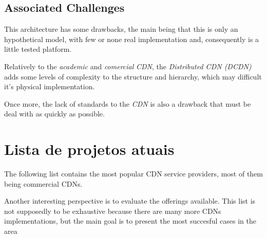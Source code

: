 \documentclass{llncs}
\begin{document}
\subsection{Associated Challenges}

This architecture has some drawbacks, the main being that this is
only an hypothetical model, with few or none real implementation
and, consequently is a little tested platform.

Relatively to the \emph{academic} and \emph{comercial} \textit{CDN},
the \emph{Distributed CDN (DCDN)} adds some levels of complexity to the structure and
hierarchy, which may difficult it's physical implementation.

Once more, the lack of standards to the \textit{CDN} is also
a drawback that must be deal with as quickly as possible.




\section{Lista de projetos atuais}							%

The following list contains the most popular CDN service providers,
most of them being commercial CDNs. 

Another interesting perspective is to evaluate the offerings available.
This list is not supposedly to be exhaustive because there are many more
CDNs implementations, but the main goal is to present the most succesful
cases in the area
\end{document}
